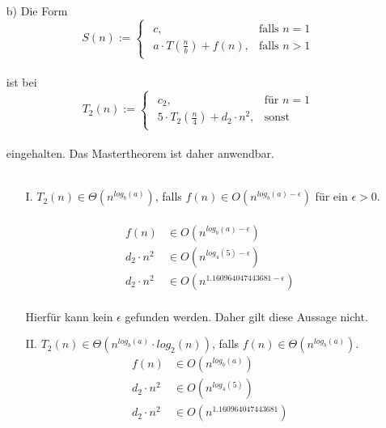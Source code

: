 \documentclass{article}
\begin{document}
\begin{enumerate}
    \item [b)]
    Die Form\\
    \[
	S(n) :=  \begin{cases}
	    	\begin{array}{ll}
    			c, & \text{falls }n=1\\
				a \cdot T(\frac{n}{b})+f(n), &\text{falls }n>1
			\end{array}
		\end{cases}
   	\]
   	\\
   	ist bei\\
   	\[
	T_2(n) := \begin{cases}
				\begin{array}{ll}
					c_2,			& \text{für }n=1\\
					5 \cdot T_2(\frac{n}{4})+d_2\cdot n^2, & \text{sonst}
				\end{array}
			\end{cases}
   	\]
   	\\
   	eingehalten. Das Mastertheorem ist daher anwendbar.\\
   	\\
   	\begin{enumerate}
   	    \item[I.]
   	    $T_2(n) \in \Theta (n^{log_b(a)})$, falls $f(n) \in O(n^{log_b(a)- \epsilon})$ für ein $\epsilon > 0$.\\
   	    \\
   	    \[
   	        \begin{array}{ll}
   	            f(n) &\in O(n^{log_b(a)- \epsilon})\\
   	            d_2\cdot n^2 &\in O(n^{log_4(5)- \epsilon})\\
   	            d_2\cdot n^2 &\in O(n^{1.160964047443681- \epsilon})
   	        \end{array}
   	    \]
   	    \\
   	    Hierfür kann kein $\epsilon$ gefunden werden. Daher gilt diese Aussage nicht.\\
   	    \item[II.]
   	    $T_2(n) \in \Theta (n^{log_b(a)} \cdot log_2(n))$, falls $f(n) \in \Theta (n^{log_b(a)})$.\\
   	    \[
   	        \begin{array}{ll}
   	            f(n) &\in O(n^{log_b(a)})\\
   	            d_2\cdot n^2 &\in O(n^{log_4(5)})\\
   	            d_2\cdot n^2 &\in O(n^{1.160964047443681})
   	        \end{array}
\]
\end{enumerate}
\end{enumerate}
\end{document}
